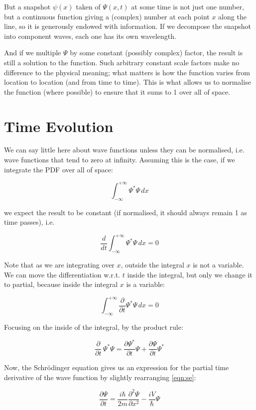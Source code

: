 But a snapshot $\psi(x)$ taken of $\Psi(x, t)$ at some time is not just one number, but a continuous function giving a (complex) number at each point $x$ along the line, so it is generously endowed with information. If we decompose the snapshot into component waves, each one has its own wavelength.

And if we multiple $\Psi$ by some constant (possibly complex) factor, the result is still a solution to the function. Such arbitrary constant scale factors make no difference to the physical meaning; what matters is how the function varies from location to location (and from time to time). This is what allows us to normalise the function (where possible) to ensure that it sums to 1 over all of space.

\section{Time Evolution}

We can say little here about wave functions unless they can be normalised, i.e. wave functions that tend to zero at infinity. Assuming this is the case, if we integrate the PDF over all of space:

$$
\int_{-\infty}^{+\infty}
\Psi^*\Psi
\,dx
$$

we expect the result to be constant (if normalised, it should always remain 1 as time passes), i.e.

$$
\frac{d}{d t}
\int_{-\infty}^{+\infty}
\Psi^*\Psi
\,dx
= 0
$$

Note that as we are integrating over $x$, outside the integral $x$ is not a variable. We can move the differentiation w.r.t. $t$ inside the integral, but only we change it to partial, because inside the integral $x$ is a variable:

$$
\int_{-\infty}^{+\infty}
\frac{\partial}{\partial t}
\Psi^*\Psi
\,dx
= 0
$$

Focusing on the inside of the integral, by the product rule:

$$
\frac{\partial}{\partial t} \, \Psi^*\Psi
=
\frac{\partial \Psi^*}{\partial t} \Psi
+
\frac{\partial \Psi}{\partial t} \Psi^*
$$

Now, the Schrödinger equation gives us an expression for the partial time derivative of the wave function by slightly rearranging \eqref{eqn:se}:

$$
\frac{\partial \Psi}{\partial t}
=
\frac{i \hbar}{2m} \frac{\partial^2 \Psi}{\partial x^2}
- \frac{i V}{\hbar}{\Psi}
$$

